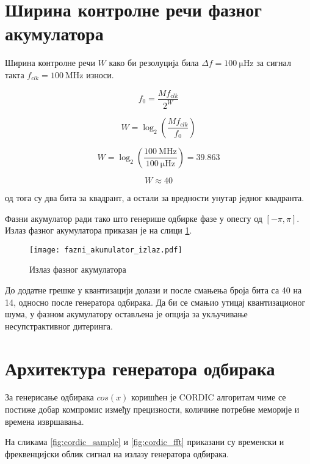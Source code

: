 \documentclass[conference]{IEEEJERM}
\begin{document}
\section{Ширина контролне речи фазног акумулатора}

Ширина контролне речи $W$ како би резолуција била $ \Delta f = \SI{100}{\micro\hertz}$ за сигнал такта $f_{clk} = \SI{100}{\mega\hertz}$ износи.

\begin{equation}
f_0 = \dfrac{M f_{clk}}{2^W}
\end{equation}

\begin{equation}
W = \log_2 \left(\dfrac{M f_{clk}}{ f_0}\right)
\end{equation}

\begin{equation}
W = \log_2 \left(\dfrac{\SI{100}{\mega \hertz}}{\SI{100}{\micro \hertz}}\right) = 39.863 
\end{equation}

\begin{equation}
W \approx 40
\end{equation}

од тога су два бита за квадрант, а остали за вредности унутар једног квадранта.

Фазни акумулатор ради тако што генерише одбирке фазе у опесгу од $\left[-\pi, \pi \right]$.
Излаз фазног акумулатора приказан је на слици \ref{fig:fai}.

\begin{figure}[H]
	\centering
	\texttt{[image: fazni\_akumulator\_izlaz.pdf]}
	\caption{Излаз фазног акумулатора}
	\label{fig:fai}
\end{figure}

До додатне грешке у квантизацији долази и после смањења броја бита са 40 на 14, односно после генератора одбирака.
Да би се смањио утицај квантизационог шума, у фазном акумулатору остављена је опција за укључивање несупстрактивног дитеринга.


\section{Архитектура генератора одбирака}

За генерисање одбирака  $cos(x)$ коришћен је CORDIC алгоритам чиме се постиже добар компромис између прецизности, количине потребне меморије и времена извршавања.	

На сликама \ref{fig:cordic_sample} и \ref{fig:cordic_fft} приказани су временски и фреквенцијски облик сигнал на излазу генератора одбирака.
\end{document}
